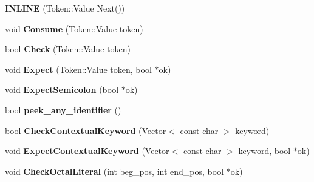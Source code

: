\begin{DoxyCompactItemize}
\item 
\hypertarget{classv8_1_1internal_1_1_parser_base_ac600608a208432620d05eac0ae2e286c}{}{\bfseries I\+N\+L\+I\+N\+E} (Token\+::\+Value Next())\label{classv8_1_1internal_1_1_parser_base_ac600608a208432620d05eac0ae2e286c}

\item 
\hypertarget{classv8_1_1internal_1_1_parser_base_ae7c4d519eec0fba6ac79e597684be639}{}void {\bfseries Consume} (Token\+::\+Value token)\label{classv8_1_1internal_1_1_parser_base_ae7c4d519eec0fba6ac79e597684be639}

\item 
\hypertarget{classv8_1_1internal_1_1_parser_base_a19aacf26eaff6ef54a06e24fac05d891}{}bool {\bfseries Check} (Token\+::\+Value token)\label{classv8_1_1internal_1_1_parser_base_a19aacf26eaff6ef54a06e24fac05d891}

\item 
\hypertarget{classv8_1_1internal_1_1_parser_base_a4f2ffa1bf410c34848bcefa414af176d}{}void {\bfseries Expect} (Token\+::\+Value token, bool $\ast$ok)\label{classv8_1_1internal_1_1_parser_base_a4f2ffa1bf410c34848bcefa414af176d}

\item 
\hypertarget{classv8_1_1internal_1_1_parser_base_aaf8a578f159f217aa7730352d78ffef4}{}void {\bfseries Expect\+Semicolon} (bool $\ast$ok)\label{classv8_1_1internal_1_1_parser_base_aaf8a578f159f217aa7730352d78ffef4}

\item 
\hypertarget{classv8_1_1internal_1_1_parser_base_a34037141c7d421551bb8dc4814699a74}{}bool {\bfseries peek\+\_\+any\+\_\+identifier} ()\label{classv8_1_1internal_1_1_parser_base_a34037141c7d421551bb8dc4814699a74}

\item 
\hypertarget{classv8_1_1internal_1_1_parser_base_a98f48663f99354c06e5f3c7fe8edea2c}{}bool {\bfseries Check\+Contextual\+Keyword} (\hyperlink{classv8_1_1internal_1_1_vector}{Vector}$<$ const char $>$ keyword)\label{classv8_1_1internal_1_1_parser_base_a98f48663f99354c06e5f3c7fe8edea2c}

\item 
\hypertarget{classv8_1_1internal_1_1_parser_base_ae5f8aeec834f3ff0542973f85cbb0812}{}void {\bfseries Expect\+Contextual\+Keyword} (\hyperlink{classv8_1_1internal_1_1_vector}{Vector}$<$ const char $>$ keyword, bool $\ast$ok)\label{classv8_1_1internal_1_1_parser_base_ae5f8aeec834f3ff0542973f85cbb0812}

\item 
\hypertarget{classv8_1_1internal_1_1_parser_base_a7a4c4a1d1d82730d2e39fc14fbf75f19}{}void {\bfseries Check\+Octal\+Literal} (int beg\+\_\+pos, int end\+\_\+pos, bool $\ast$ok)\label{classv8_1_1internal_1_1_parser_base_a7a4c4a1d1d82730d2e39fc14fbf75f19}


\end{DoxyCompactItemize}
